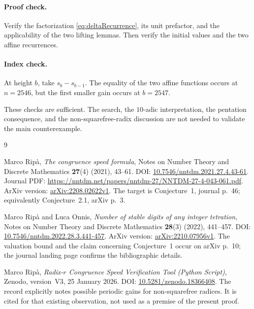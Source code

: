 \documentclass[11pt,a4paper]{article}
\theoremstyle{definition}
\theoremstyle{remark}
\begin{document}
\paragraph{Proof check.} Verify the factorization \eqref{eq:deltaRecurrence}, its unit prefactor, and the applicability of the two lifting lemmas. Then verify the initial values and the two affine recurrences.

\paragraph{Index check.} At height $b$, take $s_b-s_{b-1}$. The equality of the two affine functions occurs at $n=2546$, but the first smaller gain occurs at $b=2547$.

These checks are sufficient. The search, the $10$-adic interpretation, the pentation consequence, and the non-squarefree-radix discussion are not needed to validate the main counterexample.

\clearpage
\begin{thebibliography}{9}
Marco Rip\`a,
\emph{The congruence speed formula},
Notes on Number Theory and Discrete Mathematics \textbf{27}(4) (2021), 43--61.
DOI: \href{https://doi.org/10.7546/nntdm.2021.27.4.43-61}{10.7546/nntdm.2021.27.4.43-61}.
Journal PDF: \url{https://nntdm.net/papers/nntdm-27/NNTDM-27-4-043-061.pdf}.
ArXiv version: \href{https://arxiv.org/abs/2208.02622}{arXiv:2208.02622v1}.
The target is Conjecture~1, journal p.~46; equivalently Conjecture~2.1, arXiv p.~3.

Marco Rip\`a and Luca Onnis,
\emph{Number of stable digits of any integer tetration},
Notes on Number Theory and Discrete Mathematics \textbf{28}(3) (2022), 441--457.
DOI: \href{https://doi.org/10.7546/nntdm.2022.28.3.441-457}{10.7546/nntdm.2022.28.3.441-457}.
ArXiv version: \href{https://arxiv.org/abs/2210.07956}{arXiv:2210.07956v1}.
The valuation bound and the claim concerning Conjecture~1 occur on arXiv p.~10; the journal landing page confirms the bibliographic details.

Marco Rip\`a,
\emph{Radix-$r$ Congruence Speed Verification Tool (Python Script)},
Zenodo, version~V3, 25 January 2026.
DOI: \href{https://doi.org/10.5281/zenodo.18366408}{10.5281/zenodo.18366408}.
The record explicitly notes possible periodic gains for non-squarefree radices. It is cited for that existing observation, not used as a premise of the present proof.
\end{thebibliography}
\end{document}
